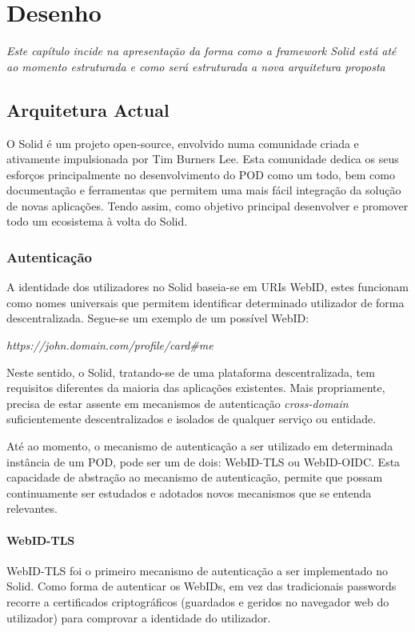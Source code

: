 
\chapter{Desenho}
\label{cap:4}
\emph{Este capítulo incide na apresentação da forma como a framework Solid está até ao momento estruturada e como será estruturada a nova arquitetura proposta}

\section{Arquitetura Actual}

O Solid é um projeto open-source, envolvido numa comunidade criada e ativamente impulsionada por Tim Burners Lee. Esta comunidade dedica os seus esforços principalmente no desenvolvimento do POD como um todo, bem como documentação e ferramentas que permitem uma mais fácil integração da solução de novas aplicações. Tendo assim, como objetivo principal desenvolver e promover todo um ecosistema à volta do Solid.

\subsection{Autenticação}
A identidade dos utilizadores no Solid baseia-se em URIs WebID, estes funcionam como nomes universais que permitem identificar determinado utilizador de forma descentralizada. Segue-se um exemplo de um possível WebID:

\emph{https://john.domain.com/profile/card\#me}

Neste sentido, o Solid, tratando-se de uma plataforma descentralizada, tem requisitos diferentes da maioria das aplicações existentes. Mais propriamente, precisa de estar assente em mecanismos de autenticação \emph{cross-domain} suficientemente descentralizados e isolados de qualquer serviço ou entidade.\cite{solid_spec}

Até ao momento, o mecanismo de autenticação a ser utilizado em determinada instância de um POD, pode ser um de dois: WebID-TLS ou WebID-OIDC. Esta capacidade de abstração ao mecanismo de autenticação, permite que possam continuamente ser estudados e adotados novos mecanismos que se entenda relevantes.\cite{solid_spec}
\subsubsection{WebID-TLS}
WebID-TLS foi o primeiro mecanismo de autenticação a ser implementado no Solid. Como forma de autenticar os WebIDs, em vez das tradicionais passwords recorre a certificados criptográficos (guardados e geridos no navegador web do utilizador) para comprovar a identidade do utilizador.\cite{solid_webid-tls:}

